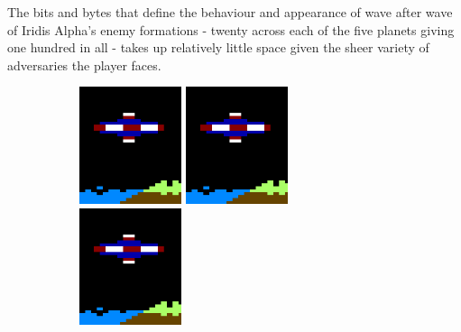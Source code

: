 The bits and bytes that define the behaviour and appearance of
wave after wave of Iridis Alpha's enemy formations - twenty across each of the
five planets giving one hundred in all - takes up relatively little space given
the sheer variety of adversaries the player faces.


\begin{figure}[H]
  {
    \setlength{\tabcolsep}{3.0pt}
    \setlength\cmidrulewidth{\heavyrulewidth} %
	\begin{subfigure}{1\textwidth}
  \hspace{0.2cm}
    \includegraphics[width=3cm]{src/sprites/gallery/sprite_162.png}%
  \hspace{1.3cm}
    \includegraphics[width=3cm]{src/sprites/gallery/sprite_162.png}%
  \hspace{1.4cm}
    \includegraphics[width=3cm]{src/sprites/gallery/sprite_162.png}%
	\end{subfigure}
  }
  \vspace{1.4cm}

  {
  \setlength{\tabcolsep}{3.0pt}
  \setlength\cmidrulewidth{\heavyrulewidth} %
  \begin{adjustbox}{width=13cm}


\end{adjustbox}}
\end{figure}

